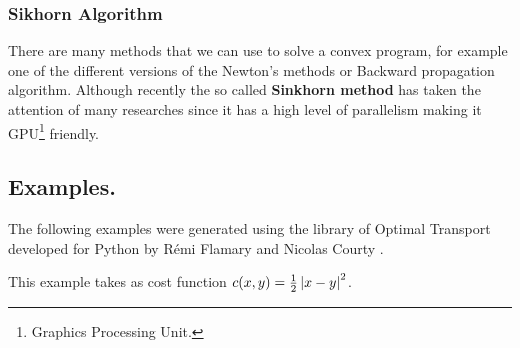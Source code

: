 \subsubsection{Sikhorn Algorithm}
There are many methods that we can use to solve a convex program, for example one of the different versions of the Newton's methods or Backward propagation algorithm. Although recently the so called \textbf{Sinkhorn method} has taken the attention of many researches since it has a high level of parallelism making it GPU\footnote{Graphics Processing Unit.} friendly.

\subsection{Examples.}

The following examples were generated using the library of Optimal Transport developed for Python by R\'emi Flamary and Nicolas Courty \cite{flamary2017pot}.

This example takes as cost function $c(x,y)=\frac{1}{2}\left| x-y \right|^2$. 